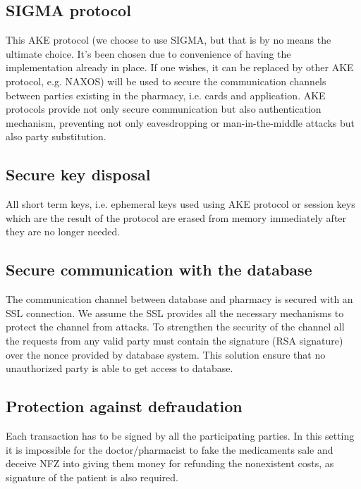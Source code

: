 \subsection{SIGMA protocol}
This AKE protocol (we choose to use SIGMA, but that is by no means the ultimate choice. It's been chosen due to convenience of having the implementation already in place. If one wishes, it can be replaced by other AKE protocol, e.g. NAXOS) will be used to secure the communication channels between parties existing in the pharmacy, i.e. cards and application. AKE protocols provide not only secure communication but also authentication mechanism, preventing not only eavesdropping or man-in-the-middle attacks but also party substitution.

\subsection{Secure key disposal}
All short term keys, i.e. ephemeral keys used using AKE protocol or session keys which are the result of the protocol are erased from memory immediately after they are no longer needed.

\subsection{Secure communication with the database}
The communication channel between database and pharmacy is secured with an SSL connection. We assume the SSL provides all the necessary mechanisms to protect the channel from attacks. To strengthen the security of the channel all the requests from any valid party must contain the signature (RSA signature) over the nonce provided by database system. This solution ensure that no unauthorized party is able to get access to database.

\subsection{Protection against defraudation}
Each transaction has to be signed by all the participating parties. In this setting it is impossible for the doctor/pharmacist to fake the medicaments sale and deceive NFZ into giving them money for refunding the nonexistent costs, as signature of the patient is also required.
